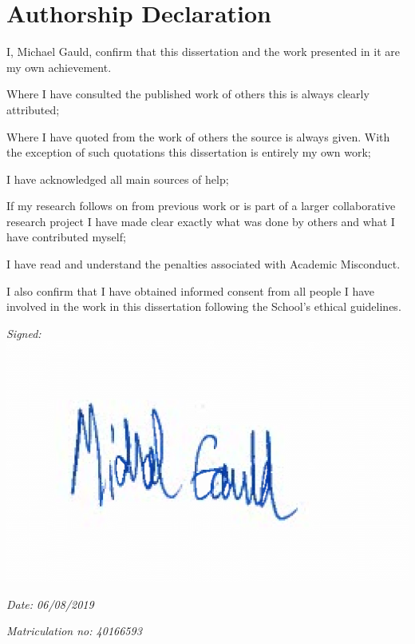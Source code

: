
\section*{Authorship Declaration}
\vspace{0.5cm}
\begin{flushleft}
I, Michael Gauld, confirm that this dissertation and the work presented in it are my own achievement.\newline

Where I have consulted the published work of others this is always clearly attributed;\newline

Where I have quoted from the work of others the source is always given. With the exception of such quotations this dissertation is entirely my own work;\newline

I have acknowledged all main sources of help; \newline

If my research follows on from previous work or is part of a larger collaborative research project I have made clear exactly what was done by others and what I have contributed myself;\newline

I have read and understand the penalties associated with Academic Misconduct.\newline

I also confirm that I have obtained informed consent from all people I have involved in the work in this dissertation following the School's ethical guidelines.\newline
\end{flushleft}

\begin{flushleft} \large
\emph{Signed:} \\
\includegraphics[scale=0.3]{Report/graphics/sig.png}
\end{flushleft}

\begin{flushleft} \large
\emph{Date: 06/08/2019} \\
\end{flushleft}

\vspace{.5cm}

\begin{flushleft} \large
\emph{Matriculation no: 40166593}  \\
\end{flushleft}